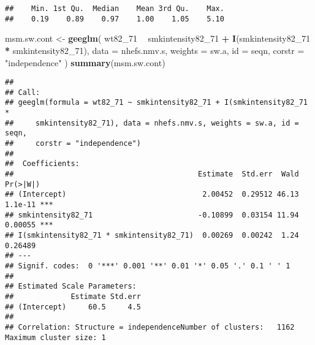 \documentclass[
  10pt,
]{book}
\newenvironment{Shaded}{\begin{snugshade}}{\end{snugshade}}
\newcommand{\CommentTok}[1]{\textcolor[rgb]{0.56,0.35,0.01}{\textit{#1}}}
\newcommand{\DataTypeTok}[1]{\textcolor[rgb]{0.13,0.29,0.53}{#1}}
\newcommand{\DecValTok}[1]{\textcolor[rgb]{0.00,0.00,0.81}{#1}}
\newcommand{\KeywordTok}[1]{\textcolor[rgb]{0.13,0.29,0.53}{\textbf{#1}}}
\newcommand{\NormalTok}[1]{#1}
\newcommand{\OperatorTok}[1]{\textcolor[rgb]{0.81,0.36,0.00}{\textbf{#1}}}
\newcommand{\StringTok}[1]{\textcolor[rgb]{0.31,0.60,0.02}{#1}}
\begin{document}
\begin{Shaded}
\end{Shaded}

\begin{verbatim}
##    Min. 1st Qu.  Median    Mean 3rd Qu.    Max. 
##    0.19    0.89    0.97    1.00    1.05    5.10
\end{verbatim}

\begin{Shaded}
\begin{Highlighting}[]
\NormalTok{msm.sw.cont <-}
\StringTok{  }\KeywordTok{geeglm}\NormalTok{(}
\NormalTok{    wt82_}\DecValTok{71} \OperatorTok{~}\StringTok{ }\NormalTok{smkintensity82_}\DecValTok{71} \OperatorTok{+}\StringTok{ }\KeywordTok{I}\NormalTok{(smkintensity82_}\DecValTok{71} \OperatorTok{*}\StringTok{ }\NormalTok{smkintensity82_}\DecValTok{71}\NormalTok{),}
    \DataTypeTok{data =}\NormalTok{ nhefs.nmv.s,}
    \DataTypeTok{weights =}\NormalTok{ sw.a,}
    \DataTypeTok{id =}\NormalTok{ seqn,}
    \DataTypeTok{corstr =} \StringTok{"independence"}
\NormalTok{  )}
\KeywordTok{summary}\NormalTok{(msm.sw.cont)}
\end{Highlighting}
\end{Shaded}

\begin{verbatim}
## 
## Call:
## geeglm(formula = wt82_71 ~ smkintensity82_71 + I(smkintensity82_71 * 
##     smkintensity82_71), data = nhefs.nmv.s, weights = sw.a, id = seqn, 
##     corstr = "independence")
## 
##  Coefficients:
##                                          Estimate  Std.err  Wald Pr(>|W|)    
## (Intercept)                               2.00452  0.29512 46.13  1.1e-11 ***
## smkintensity82_71                        -0.10899  0.03154 11.94  0.00055 ***
## I(smkintensity82_71 * smkintensity82_71)  0.00269  0.00242  1.24  0.26489    
## ---
## Signif. codes:  0 '***' 0.001 '**' 0.01 '*' 0.05 '.' 0.1 ' ' 1
## 
## Estimated Scale Parameters:
##             Estimate Std.err
## (Intercept)     60.5     4.5
## 
## Correlation: Structure = independenceNumber of clusters:   1162   Maximum cluster size: 1
\end{verbatim}
\end{document}
